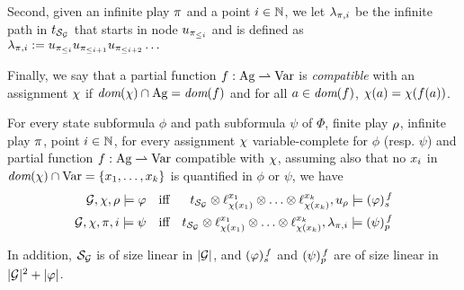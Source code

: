 Second, given an infinite play $\iplay$ and a point $i\in\setn$, we let
$\tpath_{\iplay,i}$ be the infinite path in
$\unfold[\KS_{\CGS}]{\sstate_{\pos_\init}}$ that starts in node
$\noeud_{\iplay_{\leq i}}$ and is defined as
$\tpath_{\iplay,i}\egdef\noeud_{\iplay_{\leq i}}\noeud_{\iplay_{\leq
    i+1}}\noeud_{\iplay_{\leq i+2}}\ldots$

Finally, we say that a partial   function $f:\Agf\partialto\Varf$ is
\emph{compatible} with an assignment $\assign$ if
 $\dom(\assign)\inter \Agf=\dom(f)$ and  for all $a \in \dom(f)$,  $\assign(a) = \assign(f(a))$.

 \begin{proposition}
   \label{prop-redux}
   For every  state subformula $\phi$ and path subformula $\psi$ of
   $\Phi$, finite play $\fplay$, infinite play $\iplay$, point
   $i\in\setn$, for every  assignment $\assign$ variable-complete for
   $\phi$ (resp. $\psi$) and
partial   function $f:\Agf\partialto\Varf$ compatible with $\assign$, assuming
   also that no $\var_i$ in $\dom(\assign)\inter \Varf=\{\var_1,\ldots,\var_k\}$ is
 quantified in $\phi$ or $\psi$, we have
   \begin{align*}
\CGS,\assign,{\fplay}\models\phi && \mbox{iff} &&
  \unfold[\KS_{\CGS}]{\sstate_{\pos_\init}}\prodlab
  \stratlab[\assign(\var_1)]{\var_1}\prodlab\ldots \prodlab
  \stratlab[\assign(\var_k)]{\var_k},\noeud_{\fplay} \modelst
                                                              \tr[f]{\phi}\\
\CGS,\assign,{\iplay},i\models\psi && \mbox{iff} &&
  \unfold[\KS_{\CGS}]{\sstate_{\pos_\init}}\prodlab
  \stratlab[\assign(\var_1)]{\var_1}\prodlab\ldots \prodlab
  \stratlab[\assign(\var_k)]{\var_k},\tpath_{\iplay,i} \modelst
  \trp[f]{\psi}     
   \end{align*}

  In addition, $\KS_{\CGS}$ is of size linear in
$|\CGS|$, and $\tr[f]{\phi}$ and $\trp[f]{\psi}$ are of size linear in $|\CGS|^2+|\phi|$.
 \end{proposition}

